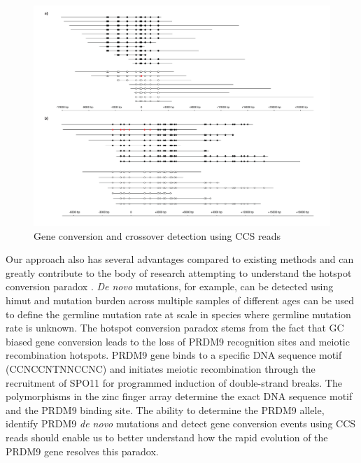 \begin{figure}[h!]
\caption{Gene conversion and crossover detection using CCS reads}
\label{figure:phase-transitions}
\begin{centering}
\includegraphics[width=\textwidth]{meiotic_recombination_detection.pdf} 
\end{centering}
\end{figure}

Our approach also has several advantages compared to existing methods and can greatly contribute to the body of research attempting to understand the hotspot conversion paradox \cite{Boulton1997-do}. \textit{De novo} mutations, for example, can be detected using himut and mutation burden across multiple samples of different ages can be used to define the germline mutation rate at scale in species where germline mutation rate is unknown. The hotspot conversion paradox stems from the fact that GC biased gene conversion leads to the loss of PRDM9 recognition sites and meiotic recombination hotspots. PRDM9 gene binds to a specific DNA sequence motif (CCNCCNTNNCCNC) \cite{Myers2008-st} and initiates meiotic recombination through the recruitment of SPO11 for programmed induction of double-strand breaks. The polymorphisms in the zinc finger array determine the exact DNA sequence motif and the PRDM9 binding site. The ability to determine the PRDM9 allele, identify PRDM9 \textit{de novo} mutations and detect gene conversion events using CCS reads should enable us to better understand how the rapid evolution of the PRDM9 gene resolves this paradox. 

